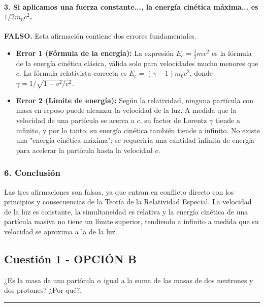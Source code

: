 \paragraph{3. Si aplicamos una fuerza constante..., la energía cinética máxima... es $1/2 m_0 c^2$.}
\textbf{FALSO.} Esta afirmación contiene dos errores fundamentales.
\begin{itemize}
    \item \textbf{Error 1 (Fórmula de la energía):} La expresión $E_c = \frac{1}{2}mv^2$ es la fórmula de la energía cinética clásica, válida solo para velocidades mucho menores que $c$. La fórmula relativista correcta es $E_c = (\gamma - 1)m_0 c^2$, donde $\gamma = 1/\sqrt{1-v^2/c^2}$.
    \item \textbf{Error 2 (Límite de energía):} Según la relatividad, ninguna partícula con masa en reposo puede alcanzar la velocidad de la luz. A medida que la velocidad de una partícula se acerca a $c$, su factor de Lorentz $\gamma$ tiende a infinito, y por lo tanto, su energía cinética también tiende a infinito. No existe una "energía cinética máxima"; se requeriría una cantidad infinita de energía para acelerar la partícula hasta la velocidad $c$.
\end{itemize}

\subsubsection*{6. Conclusión}
\begin{cajaconclusion}
Las tres afirmaciones son falsas, ya que entran en conflicto directo con los principios y consecuencias de la Teoría de la Relatividad Especial. La velocidad de la luz es constante, la simultaneidad es relativa y la energía cinética de una partícula masiva no tiene un límite superior, tendiendo a infinito a medida que su velocidad se aproxima a la de la luz.
\end{cajaconclusion}

\newpage

\subsection{Cuestión 1 - OPCIÓN B}
\label{subsec:5B_2001_sep_ext}

\begin{cajaenunciado}
¿Es la masa de una partícula $\alpha$ igual a la suma de las masas de dos neutrones y dos protones? ¿Por qué?.
\end{cajaenunciado}
\hrule

